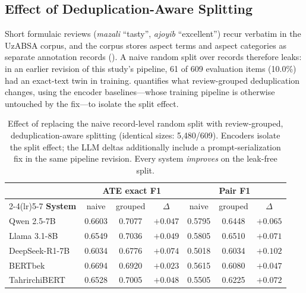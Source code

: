 \documentclass[bdcc,article,submit,moreauthors]{Definitions/mdpi}
\begin{document}
\subsection{Effect of Deduplication-Aware Splitting}
\label{sec:res_split}

Short formulaic reviews (\textit{mazali} ``tasty'', \textit{ajoyib} ``excellent'') recur verbatim in the UzABSA corpus, and the corpus stores aspect terms and aspect categories as separate annotation records (). A naive random split over records therefore leaks: in an earlier revision of this study's pipeline, 61 of 609 evaluation items (10.0\%) had an exact-text twin in training.  quantifies what review-grouped deduplication changes, using the encoder baselines---whose training pipeline is otherwise untouched by the fix---to isolate the split effect.

\begin{table}[!t]
\centering
\caption{Effect of replacing the naive record-level random split with review-grouped, deduplication-aware splitting (identical sizes: 5{,}480/609). Encoders isolate the split effect; the LLM deltas additionally include a prompt-serialization fix in the same pipeline revision. Every system \emph{improves} on the leak-free split.}
\label{tab:split_effect}
\setlength{\tabcolsep}{4pt}
\small
\begin{tabular}{lcccccc}
\toprule
& \multicolumn{3}{c}{\textbf{ATE exact F1}} & \multicolumn{3}{c}{\textbf{Pair F1}} \\
\cmidrule(lr){2-4}\cmidrule(lr){5-7}
\textbf{System} & naive & grouped & $\Delta$ & naive & grouped & $\Delta$ \\
\midrule
Qwen 2.5-7B    & 0.6603 & 0.7077 & $+0.047$ & 0.5795 & 0.6448 & $+0.065$ \\
Llama 3.1-8B   & 0.6549 & 0.7036 & $+0.049$ & 0.5805 & 0.6510 & $+0.071$ \\
DeepSeek-R1-7B & 0.6034 & 0.6776 & $+0.074$ & 0.5018 & 0.6034 & $+0.102$ \\
BERTbek        & 0.6694 & 0.6920 & $+0.023$ & 0.5615 & 0.6080 & $+0.047$ \\
TahrirchiBERT  & 0.6528 & 0.7005 & $+0.048$ & 0.5505 & 0.6225 & $+0.072$ \\
\bottomrule
\end{tabular}
\end{table}
\end{document}
